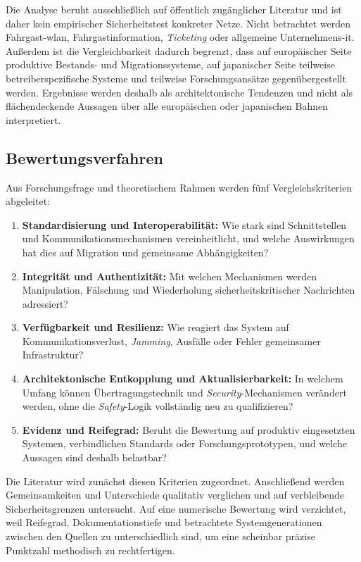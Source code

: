 \documentclass[runningheads]{res/llncs}
\begin{document}
Die Analyse beruht ausschließlich auf öffentlich zugänglicher Literatur und ist daher kein empirischer Sicherheitstest konkreter Netze. Nicht betrachtet werden Fahrgast-\gls{wlan}, Fahrgastinformation, \textit{Ticketing} oder allgemeine Unternehmens-\gls{it}. Außerdem ist die Vergleichbarkeit dadurch begrenzt, dass auf europäischer Seite produktive Bestands- und Migrationssysteme, auf japanischer Seite teilweise betreiberspezifische Systeme und teilweise Forschungsansätze gegenübergestellt werden. Ergebnisse werden deshalb als architektonische Tendenzen und nicht als flächendeckende Aussagen über alle europäischen oder japanischen Bahnen interpretiert.

\subsection{Bewertungsverfahren}
\label{sec:Bewertungsverfahren}

Aus Forschungsfrage und theoretischem Rahmen werden fünf Vergleichskriterien abgeleitet:

\begin{enumerate}
    \item \textbf{Standardisierung und Interoperabilität:} Wie stark sind Schnittstellen und Kommunikationsmechanismen vereinheitlicht, und welche Auswirkungen hat dies auf Migration und gemeinsame Abhängigkeiten?
    \item \textbf{Integrität und Authentizität:} Mit welchen Mechanismen werden Manipulation, Fälschung und Wiederholung sicherheitskritischer Nachrichten adressiert?
    \item \textbf{Verfügbarkeit und Resilienz:} Wie reagiert das System auf Kommunikationsverlust, \textit{Jamming}, Ausfälle oder Fehler gemeinsamer Infrastruktur?
    \item \textbf{Architektonische Entkopplung und Aktualisierbarkeit:} In welchem Umfang können Übertragungstechnik und \textit{Security}-Mechanismen verändert werden, ohne die \textit{Safety}-Logik vollständig neu zu qualifizieren?
    \item \textbf{Evidenz und Reifegrad:} Beruht die Bewertung auf produktiv eingesetzten Systemen, verbindlichen Standards oder Forschungsprototypen, und welche Aussagen sind deshalb belastbar?
\end{enumerate}

Die Literatur wird zunächst diesen Kriterien zugeordnet. Anschließend werden Gemeinsamkeiten und Unterschiede qualitativ verglichen und auf verbleibende Sicherheitsgrenzen untersucht. Auf eine numerische Bewertung wird verzichtet, weil Reifegrad, Dokumentationstiefe und betrachtete Systemgenerationen zwischen den Quellen zu unterschiedlich sind, um eine scheinbar präzise Punktzahl methodisch zu rechtfertigen.
\end{document}
